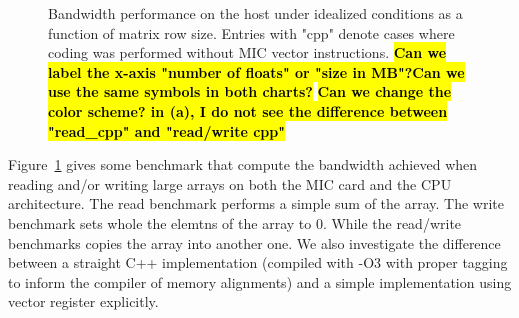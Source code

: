 \documentclass[10pt,conference,compsocconf]{IEEEtran}
\newcommand{\todo}[1]{{\color{red}\textbf{\hl{#1}}\xspace}}
\begin{document}
\begin{figure}[bth]
  \centering
  
  \caption{Bandwidth performance on the host under idealized
    conditions as a function of matrix row size.  Entries with "cpp"
    denote cases where coding was performed without MIC vector
    instructions.  \todo{Can we label the x-axis "number of floats" or
      "size in MB"?}\todo{Can we use the same symbols in both charts?}
    \todo{Can we change the color scheme? in (a), I do not see the
      difference between "read\_cpp" and "read/write cpp"} }
  \label{fig:bandwidth}
\end{figure}

Figure~\ref{fig:bandwidth} gives some benchmark that compute the
bandwidth achieved when reading and/or writing large arrays on both
the MIC card and the CPU architecture. The read benchmark performs a
simple sum of the array. The write benchmark sets whole the elemtns of
the array to 0. While the read/write benchmarks copies the array into
another one. We also investigate the difference between a straight C++
implementation (compiled with -O3 with proper tagging to inform the
compiler of memory alignments) and a simple implementation using
vector register explicitly.
\end{document}
